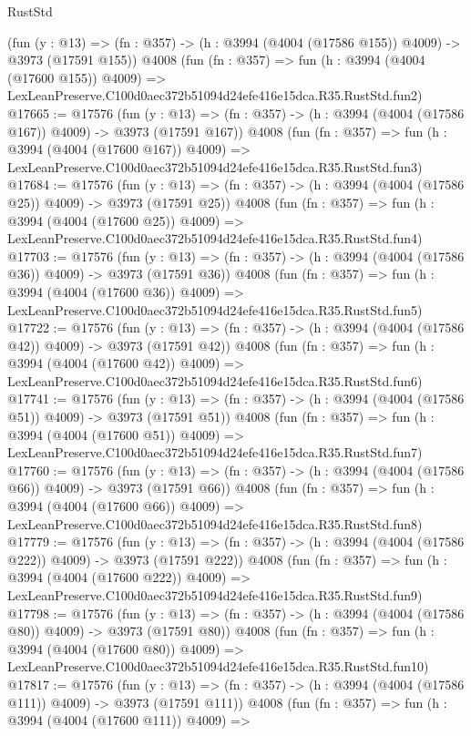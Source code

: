 \begin{lexlean}{RustStd}
\begin{coremodule}
    (fun (y : @13) => (fn : @357) -> (h : @3994 (@4004 (@17586 @155)) @4009) -> @3973 (@17591 @155))
    @4008
    (fun (fn : @357) =>
    fun (h : @3994 (@4004 (@17600 @155)) @4009) =>
    LexLeanPreserve.C100d0aec372b51094d24efe416e15dca.R35.RustStd.fun2)
@17665 := @17576
    (fun (y : @13) => (fn : @357) -> (h : @3994 (@4004 (@17586 @167)) @4009) -> @3973 (@17591 @167))
    @4008
    (fun (fn : @357) =>
    fun (h : @3994 (@4004 (@17600 @167)) @4009) =>
    LexLeanPreserve.C100d0aec372b51094d24efe416e15dca.R35.RustStd.fun3)
@17684 := @17576
    (fun (y : @13) => (fn : @357) -> (h : @3994 (@4004 (@17586 @25)) @4009) -> @3973 (@17591 @25))
    @4008
    (fun (fn : @357) =>
    fun (h : @3994 (@4004 (@17600 @25)) @4009) =>
    LexLeanPreserve.C100d0aec372b51094d24efe416e15dca.R35.RustStd.fun4)
@17703 := @17576
    (fun (y : @13) => (fn : @357) -> (h : @3994 (@4004 (@17586 @36)) @4009) -> @3973 (@17591 @36))
    @4008
    (fun (fn : @357) =>
    fun (h : @3994 (@4004 (@17600 @36)) @4009) =>
    LexLeanPreserve.C100d0aec372b51094d24efe416e15dca.R35.RustStd.fun5)
@17722 := @17576
    (fun (y : @13) => (fn : @357) -> (h : @3994 (@4004 (@17586 @42)) @4009) -> @3973 (@17591 @42))
    @4008
    (fun (fn : @357) =>
    fun (h : @3994 (@4004 (@17600 @42)) @4009) =>
    LexLeanPreserve.C100d0aec372b51094d24efe416e15dca.R35.RustStd.fun6)
@17741 := @17576
    (fun (y : @13) => (fn : @357) -> (h : @3994 (@4004 (@17586 @51)) @4009) -> @3973 (@17591 @51))
    @4008
    (fun (fn : @357) =>
    fun (h : @3994 (@4004 (@17600 @51)) @4009) =>
    LexLeanPreserve.C100d0aec372b51094d24efe416e15dca.R35.RustStd.fun7)
@17760 := @17576
    (fun (y : @13) => (fn : @357) -> (h : @3994 (@4004 (@17586 @66)) @4009) -> @3973 (@17591 @66))
    @4008
    (fun (fn : @357) =>
    fun (h : @3994 (@4004 (@17600 @66)) @4009) =>
    LexLeanPreserve.C100d0aec372b51094d24efe416e15dca.R35.RustStd.fun8)
@17779 := @17576
    (fun (y : @13) => (fn : @357) -> (h : @3994 (@4004 (@17586 @222)) @4009) -> @3973 (@17591 @222))
    @4008
    (fun (fn : @357) =>
    fun (h : @3994 (@4004 (@17600 @222)) @4009) =>
    LexLeanPreserve.C100d0aec372b51094d24efe416e15dca.R35.RustStd.fun9)
@17798 := @17576
    (fun (y : @13) => (fn : @357) -> (h : @3994 (@4004 (@17586 @80)) @4009) -> @3973 (@17591 @80))
    @4008
    (fun (fn : @357) =>
    fun (h : @3994 (@4004 (@17600 @80)) @4009) =>
    LexLeanPreserve.C100d0aec372b51094d24efe416e15dca.R35.RustStd.fun10)
@17817 := @17576
    (fun (y : @13) => (fn : @357) -> (h : @3994 (@4004 (@17586 @111)) @4009) -> @3973 (@17591 @111))
    @4008
    (fun (fn : @357) =>
    fun (h : @3994 (@4004 (@17600 @111)) @4009) =>

\end{coremodule}
\end{lexlean}
